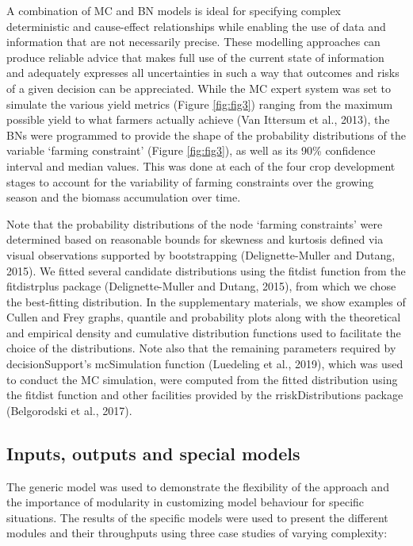 \documentclass[]{elsarticle} %
\begin{document}
A combination of MC and BN models is ideal for specifying complex deterministic and cause-effect relationships while enabling the use of data and information that are not necessarily precise. These modelling approaches can produce reliable advice that makes full use of the current state of information and adequately expresses all uncertainties in such a way that outcomes and risks of a given decision can be appreciated. While the MC expert system was set to simulate the various yield metrics (Figure \ref{fig:fig3}) ranging from the maximum possible yield to what farmers actually achieve (Van Ittersum et al., 2013), the BNs were programmed to provide the shape of the probability distributions of the variable `farming constraint' (Figure \ref{fig:fig3}), as well as its 90\% confidence interval and median values. This was done at each of the four crop development stages to account for the variability of farming constraints over the growing season and the biomass accumulation over time.

Note that the probability distributions of the node `farming constraints' were determined based on reasonable bounds for skewness and kurtosis defined via visual observations supported by bootstrapping (Delignette-Muller and Dutang, 2015). We fitted several candidate distributions using the fitdist function from the fitdistrplus package (Delignette-Muller and Dutang, 2015), from which we chose the best-fitting distribution. In the supplementary materials, we show examples of Cullen and Frey graphs, quantile and probability plots along with the theoretical and empirical density and cumulative distribution functions used to facilitate the choice of the distributions. Note also that the remaining parameters required by decisionSupport's mcSimulation function (Luedeling et al., 2019), which was used to conduct the MC simulation, were computed from the fitted distribution using the fitdist function and other facilities provided by the rriskDistributions package (Belgorodski et al., 2017).

\hypertarget{ref36}{%
\subsection{Inputs, outputs and special models}\label{ref36}}

The generic model was used to demonstrate the flexibility of the approach and the importance of modularity in customizing model behaviour for specific situations. The results of the specific models were used to present the different modules and their throughputs using three case studies of varying complexity:
\end{document}
